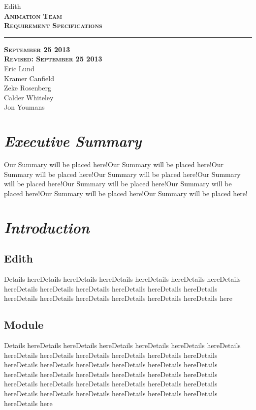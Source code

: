 \documentclass[12pt]{article}
\begin{document}
\begin{titlepage}
	\begin{center}
	\huge  Edith \\
	\vspace*{\fill}%
 	\huge \textsc{\textbf{Animation Team \\Requirement Specifications} }	
	\bigskip 
	\rule{130mm}{.1pt}
	\textsc{\textbf{September 25 2013 \\ Revised: September 25 2013} \\ }	
	\vspace*{\fill}%
	Eric Lund \\
	Kramer Canfield \\ 
	Zeke Rosenberg \\
	Calder Whiteley \\
	Jon Youmans
	\end{center}
	\end{titlepage}


\section{\emph{Executive Summary}}
Our Summary will be placed here!Our Summary will be placed here!Our Summary will be placed here!Our Summary will be placed here!Our Summary will be placed here!Our Summary will be placed here!Our Summary will be placed here!Our Summary will be placed here!Our Summary will be placed here!


\section{\emph{Introduction}}%
	\subsection{Edith}
Details hereDetails hereDetails hereDetails hereDetails hereDetails hereDetails hereDetails hereDetails hereDetails hereDetails hereDetails hereDetails hereDetails hereDetails hereDetails hereDetails hereDetails hereDetails here
	\subsection{Module}
	Details hereDetails hereDetails hereDetails hereDetails hereDetails hereDetails hereDetails hereDetails hereDetails hereDetails hereDetails hereDetails hereDetails hereDetails hereDetails hereDetails hereDetails hereDetails hereDetails hereDetails hereDetails hereDetails hereDetails hereDetails hereDetails hereDetails hereDetails hereDetails hereDetails hereDetails hereDetails hereDetails hereDetails hereDetails hereDetails hereDetails hereDetails here
\end{document}
